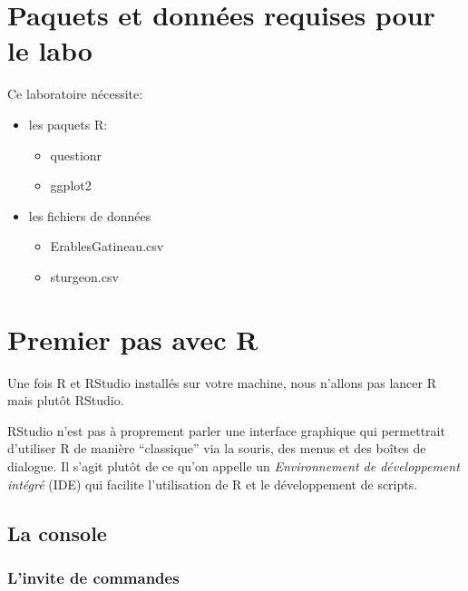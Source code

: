 \documentclass[
  12pt,
]{book}
\providecommand{\tightlist}{%
  \setlength{\itemsep}{0pt}\setlength{\parskip}{0pt}}
\begin{document}
\hypertarget{set-intro}{%
\section{Paquets et données requises pour le labo}\label{set-intro}}

Ce laboratoire nécessite:

\begin{itemize}
\tightlist
\item
  les paquets R:

  \begin{itemize}
  \tightlist
  \item
    questionr
  \item
    ggplot2
  \end{itemize}
\item
  les fichiers de données

  \begin{itemize}
  \tightlist
  \item
    ErablesGatineau.csv
  \item
    sturgeon.csv
  \end{itemize}
\end{itemize}

\hypertarget{premier-pas-avec-r}{%
\section{Premier pas avec R}\label{premier-pas-avec-r}}

Une fois R et RStudio installés sur votre machine, nous n'allons pas lancer R mais plutôt RStudio.

RStudio n'est pas à proprement parler une interface graphique qui permettrait d'utiliser R de manière ``classique'' via la souris, des menus et des boîtes de dialogue. Il s'agit plutôt de ce qu'on appelle un \emph{Environnement de développement intégré} (IDE) qui facilite l'utilisation de R et le développement de scripts.

\hypertarget{la-console}{%
\subsection{La console}\label{la-console}}

\hypertarget{linvite-de-commandes}{%
\subsubsection{L'invite de commandes}\label{linvite-de-commandes}}
\end{document}

